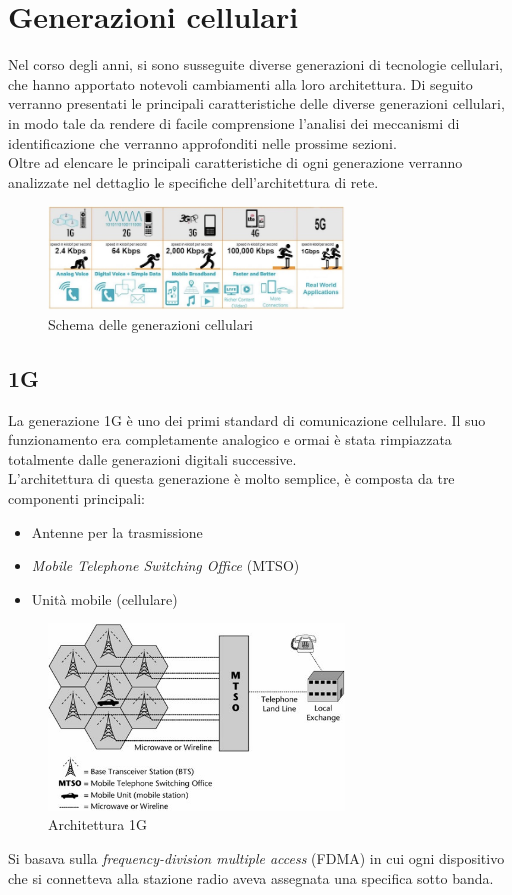 \section{Generazioni cellulari}
Nel corso degli anni, si sono susseguite diverse generazioni di tecnologie cellulari, che hanno apportato
notevoli cambiamenti alla loro architettura. Di seguito verranno presentati le principali caratteristiche
delle diverse generazioni cellulari, in modo tale da rendere di facile comprensione l'analisi dei meccanismi
di identificazione che verranno approfonditi nelle prossime sezioni.\\
Oltre ad elencare le principali caratteristiche di ogni generazione verranno analizzate nel dettaglio le specifiche  
dell'architettura di rete.
\begin{figure}[ht]
    \centering
    \includegraphics[width=0.7\textwidth]{images/generations-scheme.jpg}
    \caption{Schema delle generazioni cellulari}
\end{figure}

\subsection{1G}
La generazione 1G è uno dei primi standard di comunicazione cellulare. Il suo funzionamento era completamente analogico 
e ormai è stata rimpiazzata totalmente dalle generazioni digitali successive.\\
L'architettura di questa generazione è molto semplice, è composta da tre componenti principali:
\begin{itemize}
    \item Antenne per la trasmissione
    \item \textit{Mobile Telephone Switching Office} (MTSO)
    \item Unità mobile (cellulare)
\end{itemize}
\begin{figure}[ht]
    \centering
    \includegraphics[width=0.7\textwidth]{images/1g.jpg}
    \caption{Architettura 1G}
\end{figure}
Si basava sulla \textit{frequency-division multiple access} (FDMA) in cui ogni dispositivo che si connetteva alla stazione radio
aveva assegnata una specifica sotto banda\cite{generations}.


